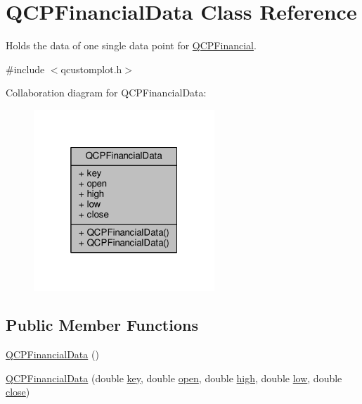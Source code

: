 \hypertarget{class_q_c_p_financial_data}{}\section{Q\+C\+P\+Financial\+Data Class Reference}
\label{class_q_c_p_financial_data}


Holds the data of one single data point for \hyperlink{class_q_c_p_financial}{Q\+C\+P\+Financial}.  




{\ttfamily \#include $<$qcustomplot.\+h$>$}



Collaboration diagram for Q\+C\+P\+Financial\+Data\+:\nopagebreak
\begin{figure}[H]
\begin{center}
\leavevmode
\includegraphics[width=193pt]{class_q_c_p_financial_data__coll__graph}
\end{center}
\end{figure}
\subsection*{Public Member Functions}
\begin{DoxyCompactItemize}
\item 
\hyperlink{class_q_c_p_financial_data_a1ca53b3a9ae4e9658a4fd1ca57d76ba4}{Q\+C\+P\+Financial\+Data} ()
\item 
\hyperlink{class_q_c_p_financial_data_a069b72c514dfd4fc8e1d5df811e54ca4}{Q\+C\+P\+Financial\+Data} (double \hyperlink{class_q_c_p_financial_data_a18bc92126f28c214b05b0161e5f5958b}{key}, double \hyperlink{class_q_c_p_financial_data_a3059e1e1fbcb9fd243fde0450f238032}{open}, double \hyperlink{class_q_c_p_financial_data_a299a4b241296fb6cd1baf5ab03f7126a}{high}, double \hyperlink{class_q_c_p_financial_data_aecce0fb45a115e3f3a25eea78491ac16}{low}, double \hyperlink{class_q_c_p_financial_data_a45e9b96944c4a08ea6c82a72d3d22df2}{close})
\end{DoxyCompactItemize}
